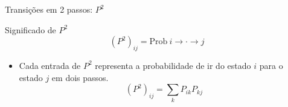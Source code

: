 \documentclass{beamer}
\begin{document}

\begin{frame}{Transições em 2 passos: $P^2$}



   \vfill
   
  \begin{block}{Significado de $P^2$}
    \[ (P^2)_{ij} = \mathrm{Prob} ~ i \to \cdot \to j  \]
  \end{block}

   \vfill
  
  \begin{itemize}
  \item Cada entrada de $P^2$ representa a probabilidade de ir do estado $i$ para o estado $j$ em dois passos.
    \[ (P^2)_{ij} = \sum_k P_{ik} P_{kj} \]
  \end{itemize}
\end{frame}

\end{document}
